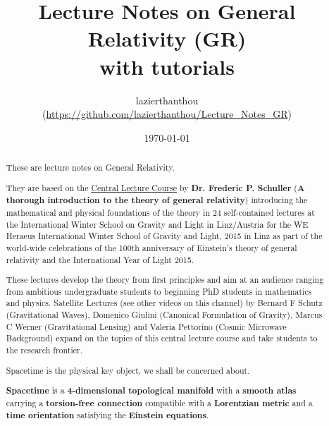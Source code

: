 \documentclass[10pt,a4paper,oneside]{article}
\theoremstyle{plain}
\theoremstyle{definition}
\theoremstyle{remark}
\numberwithin{equation}{section}
\numberwithin{figure}{section}
\numberwithin{theorem}{section}
\begin{document}

\title{Lecture Notes on General Relativity (GR)\\ \large with tutorials}
\author{lazierthanthou \\ (\url{https://github.com/lazierthanthou/Lecture_Notes_GR})}
\date{\today}

\maketitle

\tableofcontents

\begin{abstract}
These are lecture notes on General Relativity.

They are based on the \href{https://www.youtube.com/channel/UCUHKG3S9N_QeIE2jQXd2-VQ/feed}{Central Lecture Course} by \textbf{Dr. Frederic P. Schuller} (\textbf{A thorough introduction to the theory of general relativity}) introducing the mathematical and physical foundations of the theory in 24 self-contained lectures at the International Winter School on Gravity and Light in Linz/Austria for the WE Heraeus International Winter School of Gravity and Light, 2015 in Linz as part of the world-wide celebrations of the 100th anniversary of Einstein's theory of general relativity and the International Year of Light 2015.

These lectures develop the theory from first principles and aim at an audience ranging from ambitious undergraduate students to beginning PhD students in mathematics and physics. Satellite Lectures (see other videos on this channel) by Bernard F Schutz (Gravitational Waves), Domenico Giulini (Canonical Formulation of Gravity), Marcus C Werner (Gravitational Lensing) and Valeria Pettorino (Cosmic Microwave Background) expand on the topics of this central lecture course and take students to the research frontier.

Spacetime is the physical key object, we shall be concerned about.

\begin{framed}
\textbf{Spacetime} is a \textbf{4-dimensional topological manifold} with a \textbf{smooth atlas} carrying a \textbf{torsion-free connection} compatible with a \textbf{Lorentzian metric} and a \textbf{time orientation} satisfying the \textbf{Einstein equations}.
\end{framed}

\end{abstract}
\end{document}

